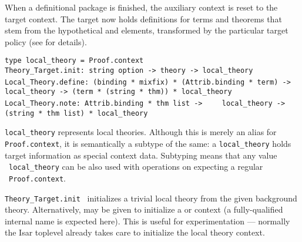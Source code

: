 \begin{isabellebody}
\begin{isamarkuptext}
  \noindent When a definitional package is finished, the auxiliary
  context is reset to the target context.  The target now holds
  definitions for terms and theorems that stem from the hypothetical
  \isa{{\isasymDEFINE}} and \isa{{\isasymNOTE}} elements, transformed by
  the particular target policy (see
  \cite[\S4--5]{Haftmann-Wenzel:2009} for details).%
\end{isamarkuptext}%
\isamarkuptrue%
%
\isadelimmlref
%
\endisadelimmlref
%
\isatagmlref
%
\begin{isamarkuptext}%
\begin{mldecls}
  \verb|type local_theory = Proof.context| \\
  \verb|Theory_Target.init: string option -> theory -> local_theory| \\[1ex]
  \verb|Local_Theory.define: (binding * mixfix) * (Attrib.binding * term) ->|\isasep\isanewline%
\verb|    local_theory -> (term * (string * thm)) * local_theory| \\
  \verb|Local_Theory.note: Attrib.binding * thm list ->|\isasep\isanewline%
\verb|    local_theory -> (string * thm list) * local_theory| \\
  \end{mldecls}

  \begin{description}

  \item \verb|local_theory| represents local theories.  Although
  this is merely an alias for \verb|Proof.context|, it is
  semantically a subtype of the same: a \verb|local_theory| holds
  target information as special context data.  Subtyping means that
  any value ~\verb|local_theory| can be also used
  with operations on expecting a regular ~\verb|Proof.context|.

  \item \verb|Theory_Target.init|~ initializes a
  trivial local theory from the given background theory.
  Alternatively,  may be given to initialize a
  \hyperlink{command.locale}{\mbox{}} or \hyperlink{command.class}{\mbox{}} context (a fully-qualified
  internal name is expected here).  This is useful for experimentation
  --- normally the Isar toplevel already takes care to initialize the
  local theory context.


\end{description}
\end{isamarkuptext}
\end{isabellebody}
